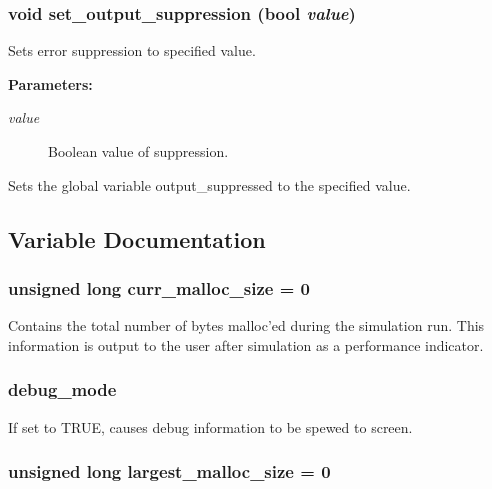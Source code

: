 \subsubsection{\setlength{\rightskip}{0pt plus 5cm}void set\_\-output\_\-suppression ({\bf bool} {\em value})}\label{util_8c_a5}


Sets error suppression to specified value.

\begin{Desc}
\item[{\bf Parameters: }]\par
\begin{description}
\item[
{\em value}]Boolean value of suppression.

\end{description}
\end{Desc}
Sets the global variable output\_\-suppressed to the specified value. 

\subsection{Variable Documentation}
\subsubsection{\setlength{\rightskip}{0pt plus 5cm}unsigned long curr\_\-malloc\_\-size = 0}\label{util_8c_a2}


Contains the total number of bytes malloc'ed during the simulation run. This information is output to the user after simulation as a performance indicator. 
\subsubsection{ debug\_\-mode}\label{util_8c_a1}


If set to TRUE, causes debug information to be spewed to screen. 
\subsubsection{\setlength{\rightskip}{0pt plus 5cm}unsigned long largest\_\-malloc\_\-size = 0}\label{util_8c_a3}


